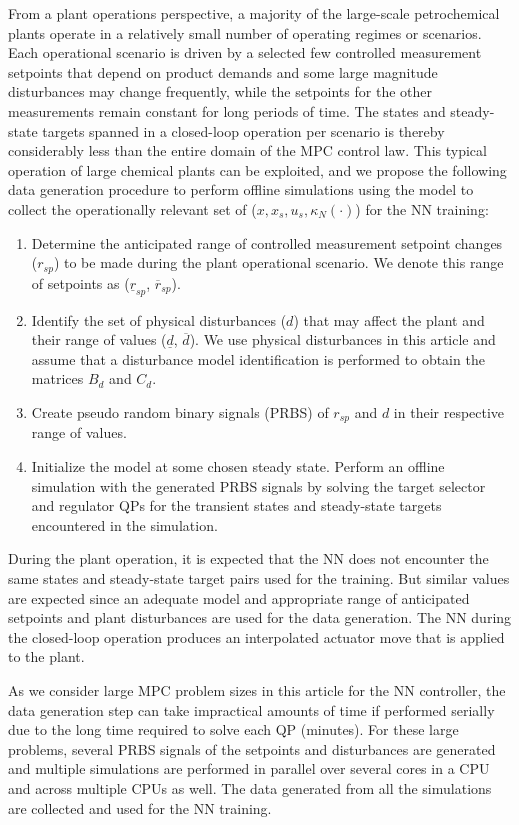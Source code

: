 \documentclass[preprint,5p, twocolumn, authoryear]{elsarticle}
\begin{document}
From a plant operations perspective, a majority of the large-scale petrochemical
plants operate in a relatively small number of operating regimes or scenarios.
Each operational scenario is driven by a selected few controlled measurement
setpoints that depend on product demands and some large magnitude disturbances
may change frequently, while the setpoints for the other measurements remain
constant for long periods of time. The states and steady-state targets spanned
in a closed-loop operation per scenario is thereby considerably less than the
entire domain of the MPC control law. This typical operation of large chemical
plants can be exploited, and we propose the following data generation procedure
to perform offline simulations using the model to collect the operationally
relevant set of ($x, x_s, u_s, \kappa_N(\cdot)$) for the NN training:

\begin{enumerate}
    \item Determine the anticipated range of controlled measurement setpoint
    changes ($r_{sp}$) to be made during the plant operational scenario. We
    denote this range of setpoints as ($\underline{r}_{sp}$,
    $\overline{r}_{sp}$).
    \item Identify the set of physical disturbances ($d$) that may affect the
    plant and their range of values ($\underline{d}$, $\overline{d}$). We use
    physical disturbances in this article and assume that a disturbance model
    identification is performed to obtain the matrices $B_d$ and $C_d$.
    \item Create pseudo random binary signals (PRBS) of $r_{sp}$ and $d$ in
    their respective range of values.
    \item Initialize the model at some chosen steady state. Perform an offline
    simulation with the generated PRBS signals by solving the target selector
    and regulator QPs for the transient states and steady-state targets
    encountered in the simulation. 
\end{enumerate}

During the plant operation, it is expected that the NN does not encounter the
same states and steady-state target pairs used for the training. But similar
values are expected since an adequate model and appropriate range of anticipated
setpoints and plant disturbances are used for the data generation. The NN during
the closed-loop operation produces an interpolated actuator move that is applied
to the plant. 

As we consider large MPC problem sizes in this article for the NN controller,
the data generation step can take impractical amounts of time if performed
serially due to the long time required to solve each QP (minutes). For these
large problems, several PRBS signals of the setpoints and disturbances are
generated and multiple simulations are performed in parallel over several cores
in a CPU and across multiple CPUs as well. The data generated from all the
simulations are collected and used for the NN training.
\end{document}
